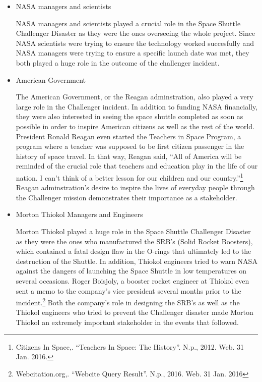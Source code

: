 \documentclass{article}
\newcommand{\q}[1]{``#1''}
\begin{document}
\begin{itemize}

\item
NASA managers and scientists

NASA managers and scientists played a crucial role in the Space Shuttle Challenger Disaster as they were the ones overseeing the whole project. Since NASA scientists were trying to ensure the technology worked succesfully and NASA managers were trying to ensure a specific launch date was met, they both played a huge role in the outcome of the challenger incident. \par

\item
American Government

The American Government, or the Reagan adminstration, also played a very large role in the Challenger incident. In addition to funding NASA financially, they were also interested in seeing the space shuttle completed as soon as possible in order to inspire American citizens as well as the rest of the world. President Ronald Reagan even started the Teachers in Space Program, a program where a teacher was supposed to be first citizen passenger in the history of space travel. In that way, Reagan said, \q{All of America will be reminded of the crucial role that teachers and education play in the life of our nation. I can't think of a better lesson for our children and our country.}\footnote{Citizens In Space,. \q{Teachers In Space: The History}. N.p., 2012. Web. 31 Jan. 2016.} Reagan adminstration's desire to inspire the lives of everyday people through the Challenger mission demonstrates their importance as a stakeholder.

\item
Morton Thiokol Managers and Engineers

Morton Thiokol played a huge role in the Space Shuttle Challenger Disaster as they were the ones who manufactured the SRB's (Solid Rocket Boosters), which contained a fatal design flaw in the O-rings that ultimately led to the destruction of the Shuttle. In addition, Thiokol engineers tried to warn NASA against the dangers of launching the Space Shuttle in low temperatures on several occasions. Roger Boisjoly, a booster rocket engineer at Thiokol even sent a memo to the company's vice president several months prior to the incident.\footnote{Webcitation.org,. \q{Webcite Query Result}. N.p., 2016. Web. 31 Jan. 2016} Both the company's role in designing the SRB's as well as the Thiokol engineers who tried to prevent the Challenger disaster made Morton Thiokol an extremely important stakeholder in the events that followed.
\end{itemize}
\end{document}

